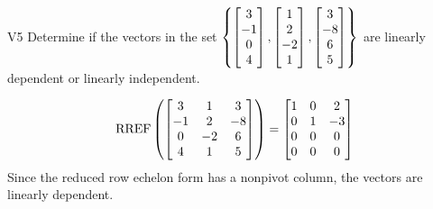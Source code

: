\begin{problem}{V5}
Determine if the vectors in the set \(\left\{\begin{bmatrix} 3 \\ -1 \\ 0 \\ 4 \end{bmatrix}, \begin{bmatrix} 1  \\ 2 \\ -2 \\ 1 \end{bmatrix}, \begin{bmatrix} 3 \\ -8 \\ 6 \\ 5 \end{bmatrix} \right\}\)  are linearly dependent or linearly independent.
\end{problem}
\begin{solution}
\[\operatorname{RREF}\left(\begin{bmatrix} 3 & 1 & 3 \\ -1 & 2 & -8 \\ 0 & -2 & 6 \\ 4 & 1 & 5 \end{bmatrix} \right) = \begin{bmatrix} 1 & 0 & 2 \\ 0 & 1 & -3 \\ 0 & 0 & 0 \\ 0 & 0 & 0 \end{bmatrix}\]
Since the reduced row echelon form has a nonpivot column, the vectors are linearly dependent.
\end{solution}


